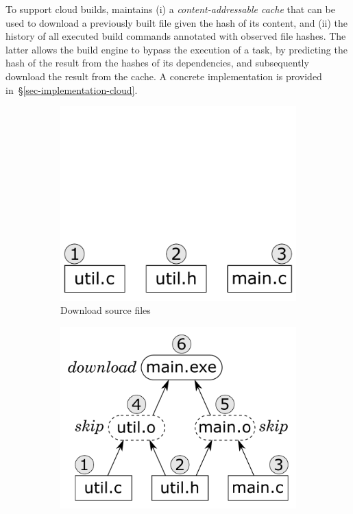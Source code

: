 To support cloud builds, \Bazel maintains (i) a \emph{content-addressable cache}
that can be used to download a previously built file given the hash of its
content, and (ii) the history of all executed build commands annotated with
observed file hashes. The latter allows the build engine to bypass the execution
of a task, by predicting the hash of the result from the hashes of its
dependencies, and subsequently download the result from the cache. A concrete
implementation is provided in~\S\ref{sec-implementation-cloud}.

\begin{figure}
\vspace{-2mm}
\begin{subfigure}[b]{0.25\linewidth}
\centerline{\includegraphics[scale=0.28]{fig/bazel-example-checkout.pdf}}
\vspace{-1mm}
\caption{Download source files}
\end{subfigure}
\begin{subfigure}[b]{0.40\linewidth}
\centerline{\includegraphics[scale=0.28]{fig/bazel-example-build.pdf}}

\end{subfigure}
\end{figure}
